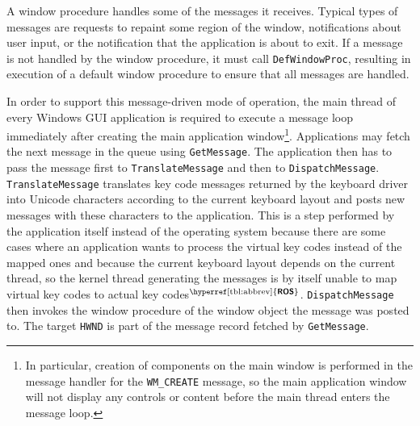 \documentclass[10pt,twocolumn,a4paper]{article}
\newcommand{\bs}[1]{\textbf{\sffamily #1}}
\newcommand{\winver}[1]{$^{\text{\hyperref[tbl:abbrev]{\bs{#1}}}}$}
\begin{document}
			A window procedure handles some of the messages it receives.
			Typical types of messages are requests to repaint some
			region of the window, notifications about user input, or the notification
			that the application is about to exit. If a message is not handled
			by the window procedure, it must call \texttt{DefWindowProc},
			resulting in execution of a default window procedure to ensure that
			all messages are handled. \cite{aboutwinproc}

			In order to support this message-driven mode of operation, the main
			thread of every Windows GUI application is required to execute a
			message loop immediately after creating the main application
			window\footnote{In particular, creation of components on the main
			window is performed in the message handler for the
			\texttt{WM\_CREATE} message, so the main application window will
			not display any controls or content before the main thread enters
			the message loop.}. Applications may fetch the next message in the
			queue using \texttt{GetMessage}. The application then has to pass
			the message first to \texttt{TranslateMessage} and then to
			\texttt{DispatchMessage}. \texttt{TranslateMessage} translates key
			code messages returned by the keyboard driver into Unicode
			characters according to the current keyboard layout and posts new
			messages with these characters to the application. This is a step performed
			by the application itself instead of the operating system because
			there are some cases where an application wants to process the virtual
			key codes instead of the mapped ones \cite{translatemessage} and because the current keyboard
			layout depends on the current thread, so the kernel thread generating
			the messages is by itself unable to map virtual key codes to actual
			key codes\winver{ROS}. \texttt{DispatchMessage} then invokes the window procedure
			of the window object the message was posted to. The target \texttt{HWND}
			is part of the message record fetched by \texttt{GetMessage}. \cite{messages}
\end{document}
